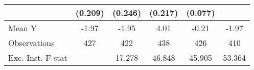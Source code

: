 {\begin{tabular}{l*{5}{c}}
            &     (0.209)         &     (0.246)         &     (0.217)         &     (0.077)         &                     \\
\midrule
Mean Y      &       -1.97         &       -1.95         &        4.01         &       -0.21         &       -1.97         \\
Observations&         427         &         422         &         438         &         426         &         410         \\
Exc. Inst. F-stat&                     &      17.278         &      46.848         &      45.905         &      53.364         \\
\bottomrule
\end{tabular}
}
